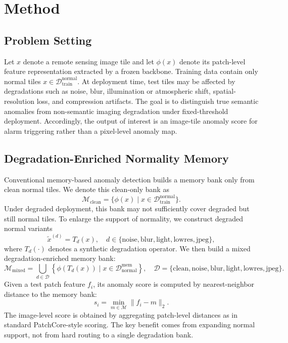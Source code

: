 \documentclass[remotesensing,article,submit,pdftex,moreauthors]{Definitions/mdpi}
\begin{document}
\section{Method}
\subsection{Problem Setting}
Let $x$ denote a remote sensing image tile and let $\phi(x)$ denote its patch-level feature representation extracted by a frozen backbone. Training data contain only normal tiles $x \in \mathcal{D}_{\text{train}}^{\text{normal}}$. At deployment time, test tiles may be affected by degradations such as noise, blur, illumination or atmospheric shift, spatial-resolution loss, and compression artifacts. The goal is to distinguish true semantic anomalies from non-semantic imaging degradation under fixed-threshold deployment. Accordingly, the output of interest is an image-tile anomaly score for alarm triggering rather than a pixel-level anomaly map.

\subsection{Degradation-Enriched Normality Memory}
Conventional memory-based anomaly detection builds a memory bank only from clean normal tiles. We denote this clean-only bank as
\begin{equation}
\mathcal{M}_{\text{clean}} = \{\phi(x) \mid x \in \mathcal{D}_{\text{train}}^{\text{normal}}\}.
\end{equation}
Under degraded deployment, this bank may not sufficiently cover degraded but still normal tiles. To enlarge the support of normality, we construct degraded normal variants
\begin{equation}
\tilde{x}^{(d)} = T_d(x), \quad d \in \{\text{noise}, \text{blur}, \text{light}, \text{lowres}, \text{jpeg}\},
\end{equation}
where $T_d(\cdot)$ denotes a synthetic degradation operator. We then build a mixed degradation-enriched memory bank:
\begin{equation}
\mathcal{M}_{\text{mixed}}
=
\bigcup_{d \in \mathcal{D}}
\left\{
\phi(T_d(x)) \mid x \in \mathcal{D}_{\text{normal}}^{\text{mem}}
\right\},
\quad
\mathcal{D}=\{\text{clean},\text{noise},\text{blur},\text{light},\text{lowres},\text{jpeg}\}.
\end{equation}
Given a test patch feature $f_i$, its anomaly score is computed by nearest-neighbor distance to the memory bank:
\begin{equation}
s_i = \min_{m \in \mathcal{M}} \| f_i - m \|_2.
\end{equation}
The image-level score is obtained by aggregating patch-level distances as in standard PatchCore-style scoring. The key benefit comes from expanding normal support, not from hard routing to a single degradation bank.
\end{document}
